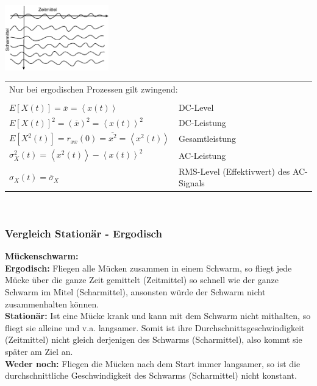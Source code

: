 	\begin{minipage}{5cm}
		\includegraphics[width=4.5cm]{bilder/zeit-scharmittel.png}
  	\end{minipage}
	\begin{minipage}{13.5cm}

	\begin{tabular}{ll}
  		\multicolumn{2}{l}{Nur bei ergodischen Prozessen gilt zwingend:} \\ \\
      $E[X(t)] = \overline{x} = \left\langle x(t) \right\rangle$ & DC-Level \\
      $E[X(t)]^{2} = (\overline{x})^{2} = \left\langle x(t) \right\rangle^{2}$ & DC-Leistung \\
      $E[X^{2}(t)] = r_{xx}(0) = \overline{x^{2}} = 
                     \left\langle x^{2}(t) \right\rangle $ & Gesamtleistung \\
      $\sigma_{X}^{2}(t) = \left\langle x^{2}(t) \right\rangle 
                           - \left\langle x(t) \right\rangle^{2}$ & AC-Leistung \\
      $\sigma_{X}(t) = \overline{\sigma}_{X}$ & RMS-Level (Effektivwert) des AC-Signals\\
    \end{tabular} \\
  	\end{minipage}


\subsubsection{Vergleich Stationär - Ergodisch}
\textbf{Mückenschwarm:}\\
\textbf{Ergodisch:} Fliegen alle Mücken zusammen in einem Schwarm, so fliegt jede Mücke über die
ganze Zeit gemittelt (Zeitmittel) so schnell wie der ganze Schwarm im Mitel (Scharmittel), ansonsten
würde der Schwarm nicht zusammenhalten können. \\
\textbf{Stationär:} Ist eine Mücke krank und kann mit dem Schwarm nicht mithalten, so fliegt sie
alleine und v.a. langsamer. Somit ist ihre Durchschnittsgeschwindigkeit (Zeitmittel) nicht gleich
derjenigen des Schwarms (Scharmittel), also kommt sie später am Ziel an. \\
\textbf{Weder noch:} Fliegen die Mücken nach dem Start immer langsamer, so ist die
durchschnittliche Geschwindigkeit des Schwarms (Scharmittel) nicht konstant.

